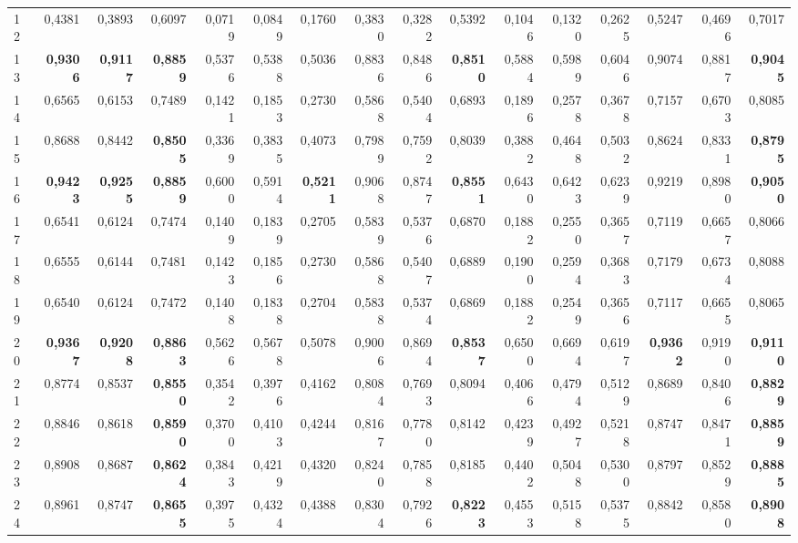 \begin{table}[htp!]
\begin{adjustwidth}{-2cm}{}
\begin{tabular}{ l | *{15}{| r}}
12	&	0,4381	&	0,3893	&	0,6097	&	0,0719	&	0,0849	&	0,1760	&	0,3830	&	0,3282	&	0,5392	&	0,1046	&	0,1320	&	0,2625	&	0,5247	&	0,4696	&	0,7017	\\
13	&	\textbf{0,9306}	&	\textbf{0,9117}	&	\textbf{0,8859}	&	0,5376	&	0,5388	&	0,5036	&	0,8836	&	0,8486	&	\textbf{0,8510}	&	0,5884	&	0,5989	&	0,6046	&	0,9074	&	0,8817	&	\textbf{0,9045}	\\
14	&	0,6565	&	0,6153	&	0,7489	&	0,1421	&	0,1853	&	0,2730	&	0,5868	&	0,5404	&	0,6893	&	0,1896	&	0,2578	&	0,3678	&	0,7157	&	0,6703	&	0,8085	\\
15	&	0,8688	&	0,8442	&	\textbf{0,8505}	&	0,3369	&	0,3835	&	0,4073	&	0,7989	&	0,7592	&	0,8039	&	0,3882	&	0,4648	&	0,5032	&	0,8624	&	0,8331	&	\textbf{0,8795}	\\
16	&	\textbf{0,9423}	&	\textbf{0,9255}	&	\textbf{0,8859}	&	0,6000	&	0,5914	&	\textbf{0,5211}	&	0,9068	&	0,8747	&	\textbf{0,8551}	&	0,6430	&	0,6423	&	0,6239	&	0,9219	&	0,8980	&	\textbf{0,9050}	\\
17	&	0,6541	&	0,6124	&	0,7474	&	0,1409	&	0,1839	&	0,2705	&	0,5839	&	0,5376	&	0,6870	&	0,1882	&	0,2550	&	0,3657	&	0,7119	&	0,6657	&	0,8066	\\
18	&	0,6555	&	0,6144	&	0,7481	&	0,1423	&	0,1856	&	0,2730	&	0,5868	&	0,5407	&	0,6889	&	0,1900	&	0,2594	&	0,3683	&	0,7179	&	0,6734	&	0,8088	\\
19	&	0,6540	&	0,6124	&	0,7472	&	0,1408	&	0,1838	&	0,2704	&	0,5838	&	0,5374	&	0,6869	&	0,1882	&	0,2549	&	0,3656	&	0,7117	&	0,6655	&	0,8065	\\
20	&	\textbf{0,9367}	&	\textbf{0,9208}	&	\textbf{0,8863}	&	0,5626	&	0,5678	&	0,5078	&	0,9006	&	0,8694	&	\textbf{0,8537}	&	0,6500	&	0,6694	&	0,6197	&	\textbf{0,9362}	&	0,9190	&	\textbf{0,9110}	\\
21	&	0,8774	&	0,8537	&	\textbf{0,8550}	&	0,3542	&	0,3976	&	0,4162	&	0,8084	&	0,7693	&	0,8094	&	0,4066	&	0,4794	&	0,5129	&	0,8689	&	0,8406	&	\textbf{0,8829}	\\
22	&	0,8846	&	0,8618	&	\textbf{0,8590}	&	0,3700	&	0,4103	&	0,4244	&	0,8167	&	0,7780	&	0,8142	&	0,4239	&	0,4927	&	0,5218	&	0,8747	&	0,8471	&	\textbf{0,8859}	\\
23	&	0,8908	&	0,8687	&	\textbf{0,8624}	&	0,3843	&	0,4219	&	0,4320	&	0,8240	&	0,7858	&	0,8185	&	0,4402	&	0,5048	&	0,5300	&	0,8797	&	0,8529	&	\textbf{0,8885}	\\
24	&	0,8961	&	0,8747	&	\textbf{0,8655}	&	0,3975	&	0,4324	&	0,4388	&	0,8304	&	0,7926	&	\textbf{0,8223}	&	0,4553	&	0,5158	&	0,5375	&	0,8842	&	0,8580	&	\textbf{0,8908}	\\

\end{tabular}
\end{adjustwidth}
\end{table}
